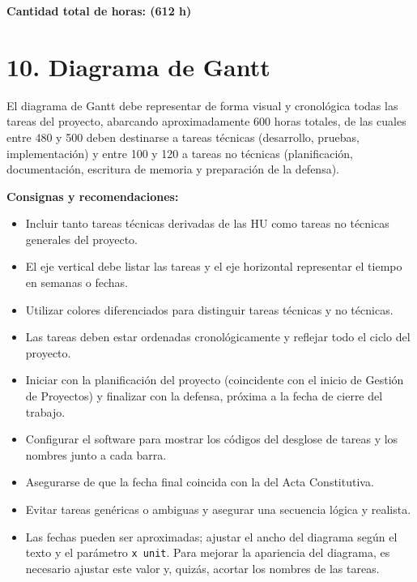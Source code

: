 \documentclass[
11pt, %
]{charter}
\begin{document}
\vspace{0.2cm}
\noindent\dotfill

\vspace{0.5cm}
\noindent
\textbf{Cantidad total de horas: (612 h)}

\newpage


\section{10. Diagrama de Gantt}
\label{sec:gantt}

El diagrama de Gantt debe representar de forma visual y cronológica todas las tareas del proyecto, abarcando aproximadamente 600 horas totales, de las cuales entre 480 y 500 deben destinarse a tareas técnicas (desarrollo, pruebas, implementación) y entre 100 y 120 a tareas no técnicas (planificación, documentación, escritura de memoria y preparación de la defensa).

\textbf{Consignas y recomendaciones:}
\begin{itemize}
  \item Incluir tanto tareas técnicas derivadas de las HU como tareas no técnicas generales del proyecto.
  \item El eje vertical debe listar las tareas y el eje horizontal representar el tiempo en semanas o fechas.
  \item Utilizar colores diferenciados para distinguir tareas técnicas y no técnicas.
  \item Las tareas deben estar ordenadas cronológicamente y reflejar todo el ciclo del proyecto.
  \item Iniciar con la planificación del proyecto (coincidente con el inicio de Gestión de Proyectos) y finalizar con la defensa, próxima a la fecha de cierre del trabajo.
  \item Configurar el software para mostrar los códigos del desglose de tareas y los nombres junto a cada barra.
  \item Asegurarse de que la fecha final coincida con la del Acta Constitutiva.
  \item Evitar tareas genéricas o ambiguas y asegurar una secuencia lógica y realista.
  \item Las fechas pueden ser aproximadas; ajustar el ancho del diagrama según el texto y el parámetro \texttt{x unit}. Para mejorar la apariencia del diagrama, es necesario ajustar este valor y, quizás, acortar los nombres de las tareas.
\end{itemize}
\end{document}
